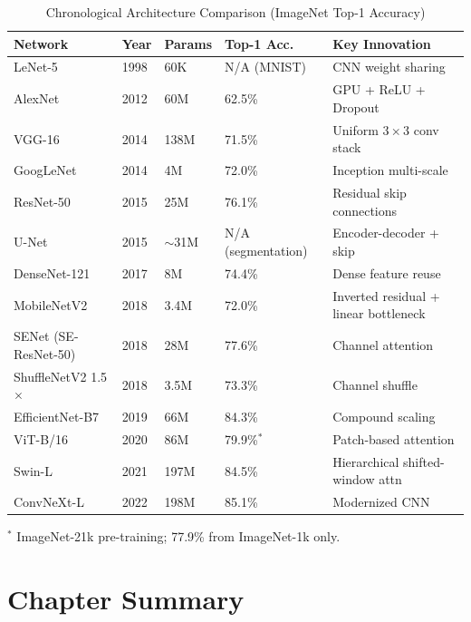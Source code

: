 \begin{table}[ht]
    \centering
    \caption{Chronological Architecture Comparison (ImageNet Top-1 Accuracy)}
    \begin{tabular}{L{2.8cm} L{1.3cm} L{2cm} L{2.5cm} L{4cm}}
        \toprule
        \textbf{Network} & \textbf{Year} & \textbf{Params} & \textbf{Top-1 Acc.} & \textbf{Key Innovation} \\
        \midrule
        LeNet-5 & 1998 & 60K & N/A (MNIST) & CNN weight sharing \\
        AlexNet & 2012 & 60M & 62.5\% & GPU + ReLU + Dropout \\
        VGG-16 & 2014 & 138M & 71.5\% & Uniform $3\times3$ conv stack \\
        GoogLeNet & 2014 & 4M & 72.0\% & Inception multi-scale \\
        ResNet-50 & 2015 & 25M & 76.1\% & Residual skip connections \\
        U-Net & 2015 & $\sim$31M & N/A (segmentation) & Encoder-decoder + skip \\
        DenseNet-121 & 2017 & 8M & 74.4\% & Dense feature reuse \\
        MobileNetV2 & 2018 & 3.4M & 72.0\% & Inverted residual + linear bottleneck \\
        SENet (SE-ResNet-50) & 2018 & 28M & 77.6\% & Channel attention \\
        ShuffleNetV2 1.5$\times$ & 2018 & 3.5M & 73.3\% & Channel shuffle \\
        EfficientNet-B7 & 2019 & 66M & 84.3\% & Compound scaling \\
        ViT-B/16 & 2020 & 86M & 79.9\%$^*$ & Patch-based attention \\
        Swin-L & 2021 & 197M & 84.5\% & Hierarchical shifted-window attn \\
        ConvNeXt-L & 2022 & 198M & 85.1\% & Modernized CNN \\
        \bottomrule
    \end{tabular}
    \footnotesize{$^*$ ImageNet-21k pre-training; 77.9\% from ImageNet-1k only.}
\end{table}

\section{Chapter Summary}

